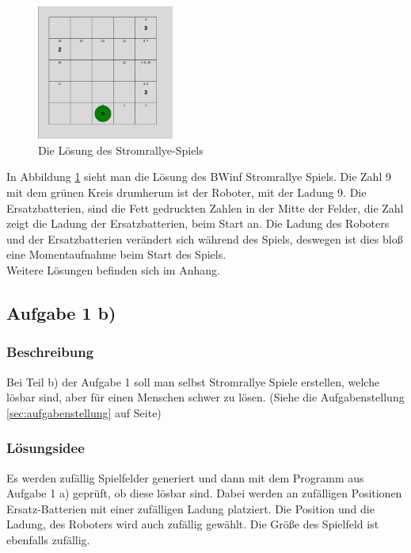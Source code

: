 \documentclass[a4paper,12pt,arial]{scrartcl}
\begin{document}
\begin{figure} 
    \vspace{-10pt}
    \includegraphics[width=0.4\textwidth]{Solution.pdf}
    \caption{Die Lösung des Stromrallye-Spiels}
    \label{fig:loesung1}
    \vspace{-35pt}
\end{figure}

In Abbildung \ref{fig:loesung1} sieht man die Lösung des BWinf Stromrallye Spiels. Die Zahl 9 mit dem grünen Kreis drumherum ist der Roboter, mit der Ladung 9.
Die Ersatzbatterien, sind die Fett gedruckten Zahlen in der Mitte der Felder, die Zahl zeigt die Ladung der Ersatzbatterien, beim Start an.
Die Ladung des Roboters und der Ersatzbatterien verändert sich während des Spiels, deswegen ist dies bloß eine Momentaufnahme beim Start des Spiels.
\\
Weitere Lösungen befinden sich im Anhang.
\\
\subsection{Aufgabe 1 b)}
\subsubsection{Beschreibung}
Bei Teil b) der Aufgabe 1 soll man selbst Stromrallye Spiele erstellen, welche lösbar sind, aber für einen Menschen schwer zu lösen.
(Siehe die Aufgabenstellung \ref{sec:aufgabenstellung} auf Seite\pageref{sec:aufgabenstellung})
\subsubsection{Lösungsidee}
Es werden zufällig Spielfelder generiert und dann mit dem Programm aus Aufgabe 1 a) geprüft, ob diese lösbar sind. Dabei werden an zufälligen Positionen Ersatz-Batterien mit einer zufälligen Ladung platziert. Die Position und die Ladung, des Roboters wird auch zufällig gewählt.
Die Größe des Spielfeld ist ebenfalls zufällig.
\end{document}
